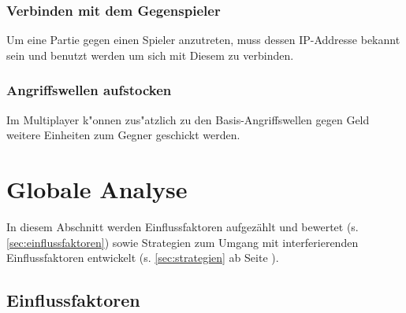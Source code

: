 \documentclass[enabledeprecatedfontcommands,fontsize=12pt,paper=a4,twoside,parskip=half]{scrartcl}
\newcounter{issue}
\newcounter{strategie}%
\begin{document}
\subsubsection{Verbinden mit dem Gegenspieler}
Um eine Partie gegen einen Spieler anzutreten, muss dessen IP-Addresse bekannt sein und benutzt werden um sich mit Diesem zu verbinden.
\subsubsection{Angriffswellen aufstocken}
Im Multiplayer k"onnen zus"atzlich zu den Basis-Angriffswellen gegen Geld weitere Einheiten zum Gegner geschickt werden.

\clearpage

\section{Globale Analyse}
\label{sec:globale_analyse}

In diesem Abschnitt werden Einflussfaktoren aufgezählt und bewertet (s. \autoref{sec:einflussfaktoren}) sowie Strategien zum Umgang mit interferierenden Einflussfaktoren entwickelt (s. \autoref{sec:strategien} ab Seite \pageref{sec:strategien}).

\subsection{Einflussfaktoren}
\label{sec:einflussfaktoren}

\end{document}
